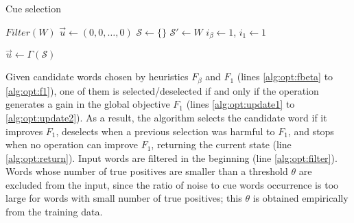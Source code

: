 \documentclass[english]{jnlp_1.4}
\newcommand{\LineIf}[2]{}
\newcommand{\LineElse}[1]{}
\newcommand{\LineIfElse}[3]{}
\begin{document}
\begin{algorithm}[!bht]
	\caption{Cue selection\label{alg:opt}}
	{\linespread{0.8}\selectfont
	\begin{algorithmic}[1]
			\State $Filter(W)$ \label{alg:opt:filter}
			\State $\vec{u} \gets (0,0,\dots,0)$ \label{alg:opt:init1}
			\State $\mathcal{S} \gets \{\}$
			\State $\mathcal{S}' \gets W$ \label{alg:opt:init2}
				\State $i_{\beta} \gets 1$, $i_{1} \gets 1$
					\LineIf{$w_i \in \mathcal{S}$}{$\vec{u}_i' \gets \Gamma(\mathcal{S} - \{w_i\})$} \label{alg:opt:next1}
					\LineElse{$\vec{u}_i' \gets \Gamma(\mathcal{S} + \{w_i\})$} \label{alg:opt:next2}
					\LineIf{$F_{\beta}(\vec{u}_i') > F_{\beta}(\vec{u}_{i_{\beta}}')$}{$i_{\beta} \gets i$} \label{alg:opt:fbeta}
					\LineIf{$F_{1}(\vec{u}_i') > F_{1}(\vec{u}_{i_{1}}')$}{$i_{1} \gets i$} \label{alg:opt:f1}
				\EndFor
				 \label{alg:opt:update1}
					\LineIfElse{$w_{i_{\beta}} \notin \mathcal{S}$}{$Select(w_{i_{\beta}})$}{$Unselect(w_{i_{\beta}})$}
				 \label{alg:opt:update2}
					\LineIfElse{$w_{i_{1}} \notin \mathcal{S}$}{$Select(w_{i_{1}})$}{$Unselect(w_{i_{1}})$}
				\EndIf
				\LineElse{\textbf{return} $\mathcal{S}$} \label{alg:opt:return}
				\State $\vec{u} \gets \Gamma(\mathcal{S})$
			\EndWhile
		\EndFunction
	\end{algorithmic}}
\end{algorithm}

Given candidate words chosen by heuristics $F_{\beta}$ and $F_1$ (lines \ref{alg:opt:fbeta} to \ref{alg:opt:f1}), one of them is selected/deselected if and only if the operation generates a gain in the global objective $F_1$ (lines \ref{alg:opt:update1} to \ref{alg:opt:update2}). As a result, the algorithm selects the candidate word if it improves $F_1$, deselects when a previous selection was harmful to $F_1$, and stops when no operation can improve $F_1$, returning the current state (line \ref{alg:opt:return}). Input words are filtered in the beginning (line \ref{alg:opt:filter}). Words whose number of true positives are smaller than a threshold $\theta$ are excluded from the input, since the ratio of noise to cue words occurrence is too large for words with small number of true positives; this $\theta$ is obtained empirically from the training data.
\end{document}
